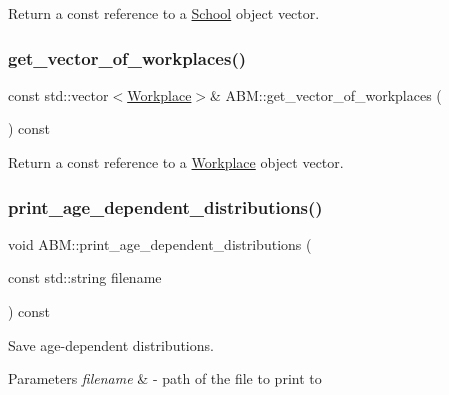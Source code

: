 Return a const reference to a \hyperlink{classSchool}{School} object vector. 

\mbox{\label{classABM_a04c29c9054c1c1dfbfb45f0af85a5a7f}} 
\subsubsection{\texorpdfstring{get\+\_\+vector\+\_\+of\+\_\+workplaces()}{get\_vector\_of\_workplaces()}}
{\footnotesize\ttfamily const std\+::vector$<$\hyperlink{classWorkplace}{Workplace}$>$\& A\+B\+M\+::get\+\_\+vector\+\_\+of\+\_\+workplaces (\begin{DoxyParamCaption}{ }\end{DoxyParamCaption}) const\hspace{0.3cm}{\ttfamily [inline]}}



Return a const reference to a \hyperlink{classWorkplace}{Workplace} object vector. 

\mbox{\label{classABM_affafd1d079fd013bbef399fb7224f569}} 
\subsubsection{\texorpdfstring{print\+\_\+age\+\_\+dependent\+\_\+distributions()}{print\_age\_dependent\_distributions()}}
{\footnotesize\ttfamily void A\+B\+M\+::print\+\_\+age\+\_\+dependent\+\_\+distributions (\begin{DoxyParamCaption}\item[{const std\+::string}]{filename }\end{DoxyParamCaption}) const}



Save age-\/dependent distributions. 


\begin{DoxyParams}{Parameters}
{\em filename} & -\/ path of the file to print to \\
\hline
\end{DoxyParams}
\mbox{\label{classABM_a736b8a17c8198534c58d9a36b35bb5cd}} 
